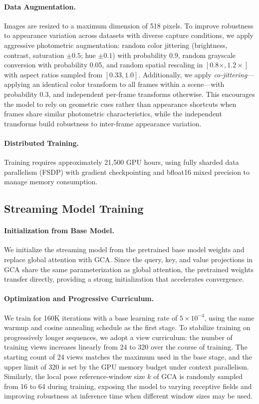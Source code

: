 \paragraph{Data Augmentation.}
Images are resized to a maximum dimension of 518 pixels.
To improve robustness to appearance variation across datasets with diverse
capture conditions, we apply aggressive photometric augmentation:
random color jittering (brightness, contrast, saturation $\pm 0.5$;
hue $\pm 0.1$) with probability 0.9, random grayscale conversion with
probability 0.05, and random spatial rescaling in
$[0.8\times, 1.2\times]$ with aspect ratios sampled from $[0.33, 1.0]$.
Additionally, we apply \emph{co-jittering}---applying an identical color
transform to all frames within a scene---with probability 0.3, and
independent per-frame transforms otherwise.
This encourages the model to rely on geometric cues rather than
appearance shortcuts when frames share similar photometric
characteristics, while the independent transforms build robustness to
inter-frame appearance variation.

\paragraph{Distributed Training.}
Training requires approximately 21,500 GPU hours, using fully sharded data
parallelism (FSDP) with gradient checkpointing and bfloat16 mixed precision
to manage memory consumption.


\subsection{Streaming Model Training}
\label{sec:streaming_training}

\paragraph{Initialization from Base Model.}
We initialize the streaming model from the pretrained base model weights
and replace global attention with GCA.
Since the query, key, and value projections in GCA share the same
parameterization as global attention, the pretrained weights transfer
directly, providing a strong initialization that accelerates convergence.

\paragraph{Optimization and Progressive Curriculum.}
We train for 160K iterations with a base learning rate of
$5 \times 10^{-4}$, using the same warmup and cosine annealing schedule
as the first stage.
To stabilize training on progressively longer sequences, we adopt a
view curriculum: the number of training views increases linearly from 24
to 320 over the course of training.
The starting count of 24 views matches the maximum used in the base
stage, and the upper limit of 320 is set by the GPU memory budget under
context parallelism.
Similarly, the local pose reference-window size $k$ of GCA is randomly sampled from 16 to 64
during training, exposing the model to varying receptive fields and
improving robustness at inference time when different window sizes may
be used.

